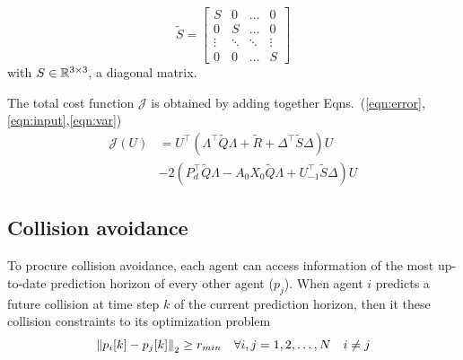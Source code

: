 \begin{equation}
\tilde{S} = \begin{bmatrix}
S & 0& \ldots & 0 \\
0 & S & \ldots & 0 \\
\vdots & \ddots & \ddots & \vdots \\
0 & 0 & \ldots & S
\end{bmatrix}
\end{equation}
with $S \in {\mathbb R}^{3 \times 3}$, a diagonal matrix.

The total cost function $\mathcal{J}$ is obtained by adding together Eqns.~(\ref{eqn:error},\ref{eqn:input},\ref{eqn:var})
\begin{equation}
\begin{aligned}
\mathcal{J}(U) &=  U^\top (\Lambda^{\top} \tilde{Q} \Lambda + \tilde{R} + \Delta^\top \tilde{S} \Delta) U \\
 & -2 (P_d^\top \tilde{Q} \Lambda -  A_0X_0 \tilde{Q} \Lambda + U_{-1}^\top \tilde{S} \Delta)U
\end{aligned}
\end{equation}	

\subsection{Collision avoidance}
To procure collision avoidance, each agent can access information of the most up-to-date prediction horizon of every other agent ($p_j$). When agent $i$ predicts a future collision at time step $k$ of the current prediction horizon, then it these collision constraints to its optimization problem
\begin{equation}
\label{eqn:coll}
\left\Vert p_i[k]-p_j[k]\right\Vert_2 \geq r_{min} \quad \forall i,j = 1,2,\ldots,N \quad i \neq j
\end{equation}	

